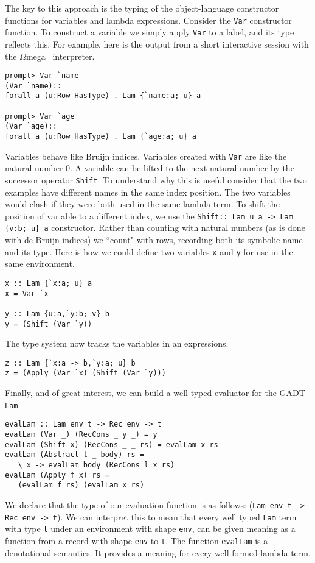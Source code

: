 \documentclass{sigplanconf}
\newcommand{\om}{$\Omega$mega}
\begin{document}
The key to this approach is the typing of the object-language constructor
functions for variables and lambda expressions. Consider the {\tt Var}
constructor function.
To construct a variable we simply apply {\tt Var} to a label, and its type
reflects this. For example, here is the output from a short interactive
session with the \om~ interpreter.
\begin{verbatim}
prompt> Var `name
(Var `name):: 
forall a (u:Row HasType) . Lam {`name:a; u} a
   
prompt> Var `age
(Var `age):: 
forall a (u:Row HasType) . Lam {`age:a; u} a
\end{verbatim}

Variables behave like Bruijn indices. Variables created with
{\tt Var} are like the natural number 0. A variable
can be lifted to the next natural number by the successor operator
{\tt Shift}. To understand why this is useful
consider that the two examples have different names in the
same index position. The two variables would clash if they were both used in the same
lambda term. To shift the position of variable to a different index, we use the
\verb+Shift:: Lam u a -> Lam {v:b; u} a+ constructor. Rather
than counting with natural numbers (as is done with de Bruijn indices)
we ``count" with rows, recording both its symbolic name and its type. Here is how we could
define two variables {\tt x} and {\tt y} for use in the same environment.

\begin{verbatim}
x :: Lam {`x:a; u} a 
x = Var `x 

y :: Lam {u:a,`y:b; v} b
y = (Shift (Var `y)) 
\end{verbatim}


The type system now tracks the variables in an expressions.
\begin{verbatim}
z :: Lam {`x:a -> b,`y:a; u} b
z = (Apply (Var `x) (Shift (Var `y))) 
\end{verbatim}

Finally, and of great interest, we can build a well-typed
evaluator for the GADT {\tt Lam}.
\begin{verbatim}
evalLam :: Lam env t -> Rec env -> t
evalLam (Var _) (RecCons _ y _) = y
evalLam (Shift x) (RecCons _ _ rs) = evalLam x rs
evalLam (Abstract l _ body) rs = 
   \ x -> evalLam body (RecCons l x rs)
evalLam (Apply f x) rs = 
   (evalLam f rs) (evalLam x rs)
\end{verbatim}
We declare that the type of our evaluation function
is as follows: (\verb+Lam env t -> Rec env -> t+). We can interpret
this to mean that every well typed {\tt Lam} term with type {\tt t} under an 
environment with shape {\tt env}, can be given meaning as a function
from a record with shape {\tt env} to {\tt t}. The function {\tt evalLam}
is a denotational semantics. It provides a meaning for every well formed
lambda term.
\end{document}
